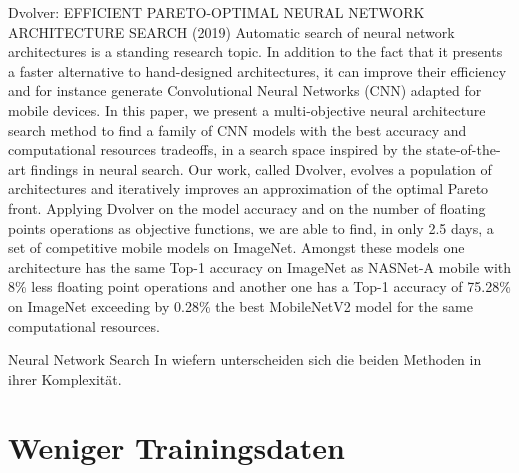 \documentclass[10pt]{beamer}
\begin{document}
\begin{frame}{Dvolver: EFFICIENT PARETO-OPTIMAL NEURAL
NETWORK ARCHITECTURE SEARCH (2019)}
Automatic search of neural network architectures is a standing research topic. In addition to the fact that it presents a faster alternative to hand-designed architectures, it can improve their efficiency and for instance generate Convolutional Neural Networks (CNN) adapted for mobile devices. In this paper, we present a multi-objective neural architecture search method to find a family of CNN models with the best accuracy and computational resources tradeoffs, in a search space inspired by the state-of-the-art findings in neural search. Our work, called Dvolver, evolves a population of architectures and iteratively improves an approximation of the optimal Pareto front. Applying Dvolver on the model accuracy and on the
number of floating points operations as objective functions, we are able to find, in only 2.5 days, a set of competitive mobile models on ImageNet. Amongst these models one architecture has the same Top-1 accuracy on ImageNet as NASNet-A mobile with 8\% less floating point operations and another one has a Top-1 accuracy of 75.28\% on ImageNet exceeding by 0.28\% the best MobileNetV2 model for the same computational resources.
\end{frame}

\begin{frame}{Neural Network Search}
 In wiefern unterscheiden sich die beiden Methoden in ihrer Komplexität.
\end{frame}

\section{Weniger Trainingsdaten}
\end{document}
